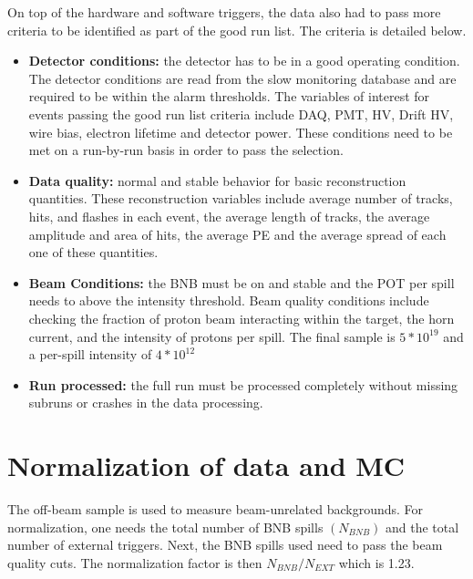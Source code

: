 On top of the hardware and software triggers, the data also had to pass more criteria to be identified as part of the good run list. The criteria is detailed below.
\begin{itemize}
\item{\textbf{Detector conditions:} the detector has to be in a good operating condition. The detector conditions are read from the slow monitoring database and are required to be within the alarm thresholds. The variables of interest for events passing the good run list criteria include DAQ, PMT, HV, Drift HV, wire bias, electron lifetime and detector power. These conditions need to be met on a run-by-run basis in order to pass the selection.}
\item{\textbf{Data quality:} normal and stable behavior for basic reconstruction quantities. These reconstruction variables include average number of tracks, hits, and flashes in each event, the average length of tracks, the average amplitude and area of hits, the average PE and the average spread of each one of these quantities.}
\item{\textbf{Beam Conditions:} the BNB must be on and stable and the POT per spill needs to above the intensity threshold. Beam quality conditions include checking the fraction of proton beam interacting within the target, the horn current, and the intensity of protons per spill. The final sample is $5 * 10^{19}$ and a per-spill intensity of $4 * 10^{12}$}
\item{\textbf{Run processed:} the full run must be processed completely without missing subruns or crashes in the data processing.}
\end{itemize}

\section{Normalization of data and MC}\label{section:normalize}
The off-beam sample is used to measure beam-unrelated backgrounds. For normalization, one needs the total number of BNB spills \textit{$(N_{BNB})$} and the total number of external triggers. Next, the BNB spills used need to pass the beam quality cuts. The normalization factor is then \textit{$N_{BNB}/N_{EXT}$} which is 1.23. 

